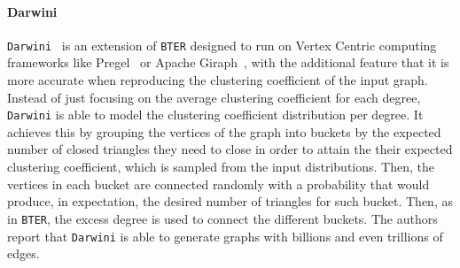 \paragraph{Darwini} \texttt{Darwini}~\cite{edunov2016darwini} is an extension of \texttt{BTER}
designed to run on Vertex Centric computing frameworks like
Pregel~\cite{malewicz2010pregel} or Apache Giraph~\cite{ching2015one}, with the
additional feature that it is more accurate when reproducing the clustering
coefficient of the input graph. Instead of just focusing on the average
clustering coefficient for each degree, \texttt{Darwini} is able to model the clustering
coefficient distribution per degree. It achieves this by grouping the vertices
of the graph into buckets by the expected number of closed triangles they need
to close in order to attain the their expected clustering coefficient, which is
sampled from the input distributions. Then, the vertices in each bucket are
connected randomly with a probability that would produce, in expectation, the
desired number of triangles for such bucket. Then, as in \texttt{BTER}, the excess degree
is used to connect the different buckets. The authors report that \texttt{Darwini} is
able to generate graphs with billions and even trillions of edges.




